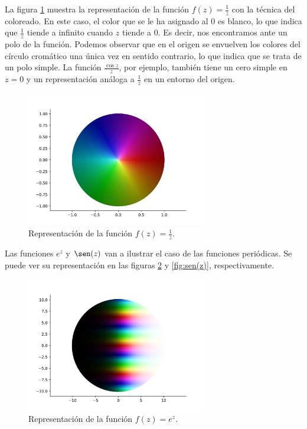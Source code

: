 La figura \ref{fig:1/z} muestra la representación de la función $f(z) = \frac{1}{z}$ con la técnica del coloreado. En este caso, el color que se le ha asignado al $0$ es blanco, lo que indica que $\frac{1}{z}$ tiende a infinito cuando $z$ tiende a $0$. Es decir, nos encontramos ante un polo de la función. Podemos observar que en el origen se envuelven los colores del círculo cromático una única vez en sentido contrario, lo que indica que se trata de un polo simple. La función $\frac{\cos z}{z}$, por ejemplo, también tiene un cero simple en $z=0$ y un representación análoga a $\frac{1}{z}$ en un entorno del origen. \\

\begin{figure}[!htbp]
    \centering
    \includegraphics[width=0.7\textwidth]{../Aplicacion/1:z.png}
    \caption{Representación de la función $f(z) = \frac{1}{z}$.}
    \label{fig:1/z}
\end{figure}

Las funciones $e^z$ y $\sen(z)$ van a ilustrar el caso de las funciones periódicas. Se puede ver su representación en las figuras \ref{fig:e^z} y \ref{fig:sen(z)}, respectivamente. \\

\begin{figure}[!htbp]
    \centering
    \includegraphics[width=0.7\textwidth]{../Aplicacion/e^z.png}
    \caption{Representación de la función $f(z) = e^z$.}
    \label{fig:e^z}
\end{figure}

